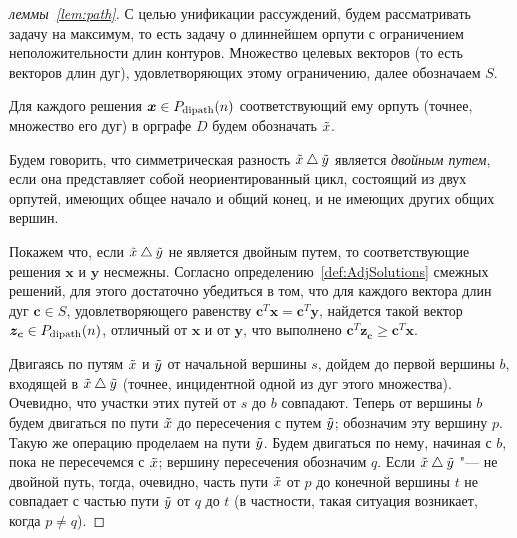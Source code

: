 \begin{proof}[леммы~\ref{lem:path}]
С целью унификации рассуждений, будем рассматривать задачу на максимум, то есть задачу о длиннейшем орпути с ограничением неположительности длин контуров.
Множество целевых векторов (то есть векторов длин дуг), удовлетворяющих этому ограничению, далее обозначаем $S$.

Для каждого решения $\bm{x} \in P_{\textup{dipath}}(n)$ соответствующий ему орпуть (точнее, множество его дуг) в орграфе $D$ будем обозначать $\tilde x$.

Будем говорить, что симметрическая разность $\tilde x \bigtriangleup \tilde y$ является \emph{двойным путем}, если она представляет собой неориентированный цикл, состоящий из двух орпутей, имеющих общее начало и общий конец, и не имеющих других общих вершин.

Покажем что, если $\tilde x \bigtriangleup \tilde y$ не является двойным путем, то соответствующие решения $\bm{x}$ и $\bm{y}$ несмежны.
Согласно определению~\ref{def:AdjSolutions} смежных решений, для этого
достаточно убедиться в том, что для каждого вектора длин дуг $\bm{c} \in S$, 
удовлетворяющего равенству $\bm{c}^T \bm{x} = \bm{c}^T \bm{y}$, найдется такой 
вектор $\bm{z_c}\in P_{\textup{dipath}}(n)$, отличный от $\bm{x}$ и от $\bm{y}$, 
что выполнено $\bm{c}^T \bm{z_c} \ge \bm{c}^T \bm{x}$.

Двигаясь по путям $\tilde x$ и $\tilde y$ от начальной вершины $s$, дойдем до первой вершины $b$, входящей в $\tilde x \bigtriangleup \tilde y$ (точнее, инцидентной одной из дуг этого множества). Очевидно, что участки этих путей от $s$ до $b$ совпадают. 
Теперь от вершины $b$ будем двигаться по пути $\tilde x$ до пересечения с путем $\tilde y$; обозначим эту вершину $p$.
Такую же операцию проделаем на пути $\tilde y$. Будем двигаться по нему, начиная с $b$, пока не пересечемся с $\tilde x$; вершину пересечения обозначим $q$. 
Если $\tilde x \bigtriangleup \tilde y$ "--- не двойной путь, тогда, очевидно, часть пути 
$\tilde x$ от $p$ до конечной вершины $t$ не совпадает с частью пути 
$\tilde y$ от $q$ до $t$ (в частности, такая ситуация возникает,
когда $p\ne q$).


\end{proof}
